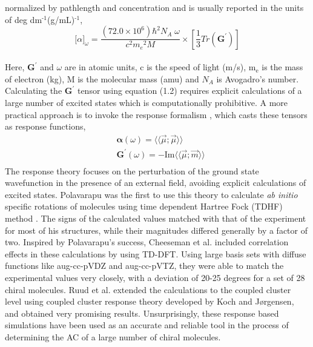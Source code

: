 normalized by pathlength and concentration and is usually reported in the units of deg dm$^{\text{-1}}$(g/mL)$^{\text{-1}}$,\cite{Crawford06}
\\
\begin{equation}
{\lbrack\alpha\rbrack}_{\omega} = \frac{(72.0 \times 10^6){\hbar}^2 N_A\;\omega}{c^2{m_e}^2 M} \times \left[ \frac{1}{3}Tr(\textbf{G}^\prime)\right]
\end{equation}
\\
Here, $\textbf{G}^\prime$ and $\omega$ are in atomic units, c is the speed of light (m/s), m$_{\text{e}}$ is the 
mass of electron (kg), M is the molecular mass (amu) and $N_A$ is Avogadro's number. Calculating the 
$\textbf{G}^\prime$ tensor using equation (1.2) requires explicit calculations of a large number of 
excited states which is computationally prohibitive. A more practical approach is to invoke the response formalism
\cite{Koch90,Kobayashi94}, which casts these tensors as response functions,
\begin{equation}
\begin{split}
&\bm{\alpha}(\omega) = \langle\langle\vec{\mu};\vec{\mu}\rangle\rangle\\
&\textbf{G}^{\prime}(\omega) = -\text{Im}\langle\langle\vec{\mu};\vec{m}\rangle\rangle\\
\end{split}
\end{equation} 
The response theory focuses on the perturbation of the ground state wavefunction in the presence of an external 
field, avoiding explicit calculations of excited states. Polavarapu was the first to use this theory to calculate 
{\em ab initio} specific rotations of molecules using time dependent Hartree Fock (TDHF) method \cite{Polavarapu96}. 
The signs of the calculated values matched with that of the experiment for most of his structures, while their magnitudes 
differed generally by a factor of two. Inspired by Polavarapu's success, Cheeseman et al. \cite{Cheeseman00,Stephens01} 
included correlation effects in these calculations by using TD-DFT. Using large basis sets with diffuse functions like 
aug-cc-pVDZ and aug-cc-pVTZ,\cite{Dunning89} they were able to match the experimental values very closely, with a 
deviation of 20-25 degrees for a set of 28 chiral molecules. Ruud et al. extended the calculations to the coupled cluster 
level using coupled cluster response theory developed by Koch and J{\o}rgensen\cite{Koch90}, and obtained very 
promising results\cite{Ruud03}. Unsurprisingly, these response based simulations have been used as an accurate and 
reliable tool in the process of determining the AC of a large number of chiral molecules\cite{Kondru99}. 


